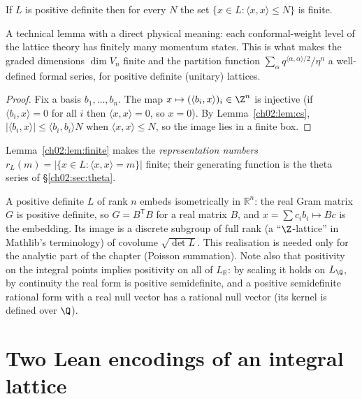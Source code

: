 \begin{lemma}[Finiteness]\label{ch02:lem:finite}
If $L$ is positive definite then for every $N$ the set $\{x\in L:\langle x,x\rangle\le N\}$ is
finite.
\end{lemma}
\begin{physics}
A technical lemma with a direct physical meaning: each conformal-weight level of the lattice theory has finitely many momentum states. This is what makes the graded dimensions $\dim V_n$ finite and the partition function $\sum_\alpha q^{\langle\alpha,\alpha\rangle/2}/\eta^n$ a well-defined formal series, for positive definite (unitary) lattices.
\end{physics}
\begin{proof}
Fix a basis $b_1,\dots,b_n$.  The map $x\mapsto(\langle b_i,x\rangle)_i\in\Z^n$ is injective
(if $\langle b_i,x\rangle=0$ for all $i$ then $\langle x,x\rangle=0$, so $x=0$).  By
Lemma~\ref{ch02:lem:cs}, $|\langle b_i,x\rangle|\le\langle b_i,b_i\rangle N$ when $\langle
x,x\rangle\le N$, so the image lies in a finite box.
\end{proof}

Lemma~\ref{ch02:lem:finite} makes the \emph{representation numbers}
$r_L(m)=|\{x\in L:\langle x,x\rangle=m\}|$ finite; their generating function is the theta series
of \S\ref{ch02:sec:theta}.

\begin{remark}\label{ch02:rem:euclid}
A positive definite $L$ of rank $n$ embeds isometrically in $\mathbb{R}^n$: the real Gram matrix
$G$ is positive definite, so $G=B^{\mathsf T}B$ for a real matrix $B$, and $x=\sum c_ib_i\mapsto
Bc$ is the embedding.  Its image is a discrete subgroup of full rank (a ``$\Z$-lattice'' in
Mathlib's terminology) of covolume $\sqrt{\det L}$.  This realisation is needed only for the
analytic part of the chapter (Poisson summation).  Note also that positivity on the integral
points implies positivity on all of $L_{\mathbb{R}}$: by scaling it holds on $L_{\Q}$, by continuity
the real form is positive semidefinite, and a positive semidefinite rational form with a real
null vector has a rational null vector (its kernel is defined over $\Q$).
\end{remark}

\section{Two Lean encodings of an integral lattice}\label{ch02:sec:twoencodings}

